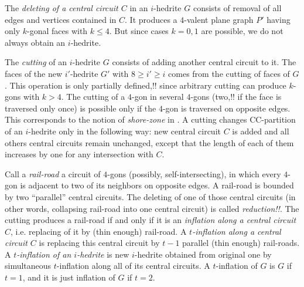 \documentclass[12pt]{article}
\begin{document}
%
%
%
%
%


The {\em deleting of a central circuit $C$} in an $i$-hedrite $G$ consists 
of removal of all edges and vertices contained in $C$. It produces a 
$4$-valent plane graph $P'$ having only $k$-gonal faces 
with $k \leq 4$. But since cases $k=0,1$ are possible, we do not
always obtain an $i$-hedrite.


The {\em cutting} of an $i$-hedrite $G$ consists of adding another central 
circuit to it. The faces of the new $i'$-hedrite $G'$ with $8\geq i'\geq i$ 
comes from the cutting of faces of $G$. This operation is only partially
defined,!! since arbitrary cutting can produce $k$-gons with $k>4$. The 
cutting of a $4$-gon in several $4$-gons (two,!! if the face
is traversed only once) is possible only if the $4$-gon is traversed 
on opposite edges. This corresponds to the notion of {\it shore-zone} 
in \cite{DSt}.
A cutting changes CC-partition of an $i$-hedrite only in the following 
way: new central circuit $C$ is added and all others central circuits 
remain unchanged, except that the length of each of them increases by one 
for any intersection with $C$. 


Call a {\em rail-road} a circuit of $4$-gons (possibly, self-intersecting), 
in which every $4$-gon is adjacent to two of its neighbors on opposite
edges. A rail-road is bounded by two ``parallel'' central circuits.
The deleting of  one of those central circuits (in other words, collapsing
rail-road into one central circuit) is called {\em reduction!!}.
The cutting produces a rail-road if and only if it is an {\em inflation 
along a central circuit $C$}, i.e. replacing of it by (thin enough) 
rail-road. A {\em $t$-inflation along a central circuit $C$} is replacing
this central circuit by $t-1$ parallel (thin enough) rail-roads.
A {\em $t$-inflation of an $i$-hedrite} is new $i$-hedrite
obtained from original one by simultaneous $t$-inflation along all
of its central circuits. 
A $t$-inflation of $G$ is $G$ if $t=1$, and it is just inflation of $G$ 
if $t=2$.
\end{document}
